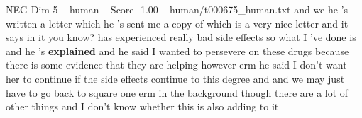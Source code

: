 \begin{textsample}{NEG Dim 5 – human – Score -1.00 – human/t000675\_human.txt}  \label{ex:f5_neg_034}
and we he 's written a letter which he 's sent me a copy of which is a very nice letter and it says in it you know? has experienced really bad side effects so what I 've done is and he 's \textbf{explained} and he said I wanted to persevere on these drugs because there is some evidence that they are helping however erm he said I don't want her to continue if the side effects continue to this degree and and we may just have to go back to square one erm in the background though there are a lot of other things and I don't know whether this is also adding to it

\end{textsample}
